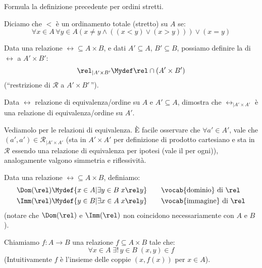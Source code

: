 \documentclass[11pt]{scrartcl}
\begin{document}
\begin{exercise}
	Formula la definizione precedente per ordini stretti.
\end{exercise}

\begin{soln}
Diciamo che $<$ è un ordinamento totale (stretto) su $A$ se:
\[ \forall x \in A \, \forall y \in A (x \ne y \land ((x < y) \lor (x > y))) \lor (x = y)
	\]
\end{soln}

\begin{definition}
	Data una relazione $\rel \subseteq A \times B$, e dati $A' \subseteq A$, $B' \subseteq B$, possiamo definire la  di $\rel$ a $A'\times B'$:
	\[ \rel_{|A' \times B'} \Mydef \rel \cap (A' \times B')
		\]
	(``restrizione di $\mathcal R$ a $A' \times B'$\,'').
\end{definition}

\begin{exercise}
	Data $\rel$ relazione di equivalenza/ordine su $A$ e $A' \subseteq A$, dimostra che $\rel_{|A' \times A'}$ è una relazione di equivalenza/ordine su $A'$.
\end{exercise}

\begin{soln}
Vediamolo per le relazioni di equivalenza. È facile osservare che $\forall a' \in A'$, vale che $(a',a') \in \mathcal{R}_{|A' \times A'}$ (sta in $A' \times A'$ per definizione di prodotto cartesiano e sta in $\mathcal{R}$ essendo una relazione di equivalenza per ipotesi (vale il per ogni)),
analogamente valgono simmetria e riflessività. 
\end{soln}

\begin{definition}
	Data una relazione $\rel \subseteq A \times B$, definiamo:
	\[  \begin{split}
		\Dom(\rel) &\Mydef \{x \in A | \exists y \in B \; x\rel y\} \qquad \text{\vocab{dominio} di $\rel$} \\
	    \Imm(\rel) &\Mydef \{y \in B | \exists x \in A \; x \rel y \} \qquad \text{\vocab{immagine} di $\rel$}
	\end{split}
			\]
	(notare che $\Dom(\rel)$ e $\Imm(\rel)$ non coincidono necessariamente con $A$ e $B$).
\end{definition}

\begin{definition}[Funzione]
	Chiamiamo  $f:A \rightarrow B$ una relazione $f \subseteq A \times B$ tale che:
	\[ \forall x \in A \; \exists ! \, y \in B \; (x,y) \in f
		\]
		(Intuitivamente $f$ è l'insieme delle coppie $(x,f(x))$ per $x \in A$).
\end{definition}
\end{document}
